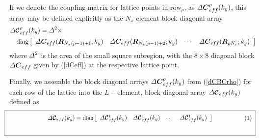 If we denote the coupling matrix for lattice points in 
$\mbox{row}_{\rho}$, as
${\mit \Delta}{\mbox{\boldmath$\mit C$\unboldmath}}{}^{\rho}_{eff}(k_y)$, this array may be defined explicitly as the $N_x$ element 
block diagonal array
\begin{eqnarray} \label{dCBCrho}
\lefteqn{{\mit \Delta}{\CB C}{}^{\rho}_{eff}(k_y)
={\mit \Delta}^{2}\times}\\
&& \mbox{diag}\left[{\begin{array}{cccc}
{\mit \Delta}{\bmi C}{}_{eff}({\bmi R}_{{N}_{x}( \rho 
  -1)+1};{k}_{y})& {\mit \Delta}{\bmi C}{}_{eff}({\bmi R}_{{N}_{x}( \rho  
 -1)+2};{k}_{y})&\cdots & {\mit \Delta}{\bmi C}{}_{eff}({\bmi R}_{ \rho {  
N}_{  x}};{k}_{y})\end{array}}\right]\nonumber
\end{eqnarray} 
where ${\mit \Delta}^{2}$ is the area of the small square subregion,
with the $8 \times 8$ diagonal block ${\mit \Delta}{\mbox{\boldmath$\mit C$\unboldmath}}{}_{eff}$ 
given by (\ref{dCeff}) at the respective lattice point. 

Finally, we assemble the block diagonal arrays ${\mit \Delta}{\mbox{\boldmath$\mit C$\unboldmath}}{}^{\rho}_{eff}(k_y)$ from (\ref{dCBCrho}) for each row of the lattice 
into the $L-$element, block diagonal array ${\mit \Delta}{\mbox{\boldmath$\cal C$\unboldmath}}_{eff}(k_y)$ defined as
\[
\!\!\!\!\!\!\fbox{
\begin{minipage} {146.0mm}
\begin{equation} \label{dCBC}
{\mit \Delta}{\CB C}_{eff}(k_y)
=\mbox{diag}\left[{\begin{array}{cccc}
{\mit \Delta}{\CB C}{}^{1}_{eff}(k_y)& 
{\mit \Delta}{\CB C}{}^{1}_{eff}(k_y)&
\cdots & 
{\mit \Delta}{\CB C}{}^{1}_{eff}(k_y) 
\end{array}}\right]
\end{equation} 
\vspace{2 mm}
\end{minipage}
}
\]


